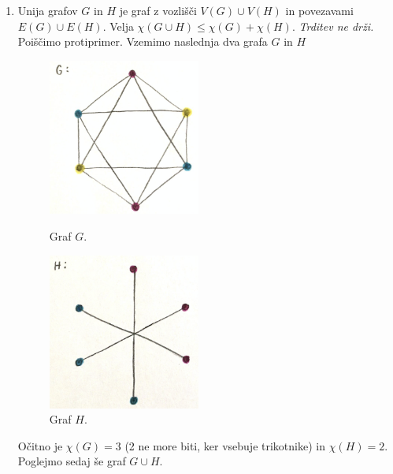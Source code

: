 \documentclass[a4paper,11pt]{article}
\begin{document}
\begin{enumerate}
    \item Unija grafov $G$ in $H$ je graf z vozlišči $V(G) \cup V(H)$ in povezavami $E(G) \cup E(H)$. Velja $\chi(G \cup H) \leq \chi(G) + \chi(H)$. \textit{Trditev ne drži.}
        \\
        Poiščimo protiprimer.
        Vzemimo naslednja dva grafa $G$ in $H$
        \begin{figure}[ht!]
            \begin{minipage}{0.5\textwidth}
                \centering
                \includegraphics[width=50mm]{G.png}
                \caption{Graf $G$.}
            \end{minipage}\hfill
            \begin{minipage}{0.5\textwidth}
                \centering
                \includegraphics[width=50mm]{H.png}
                \caption{Graf $H$.}
            \end{minipage}\hfill
        \end{figure}

        \noindent
        Očitno je $\chi(G) = 3$ (2 ne more biti, ker vsebuje trikotnike) in $\chi(H) = 2$.
        Poglejmo sedaj še graf $G \cup H$.


\end{enumerate}
\end{document}
